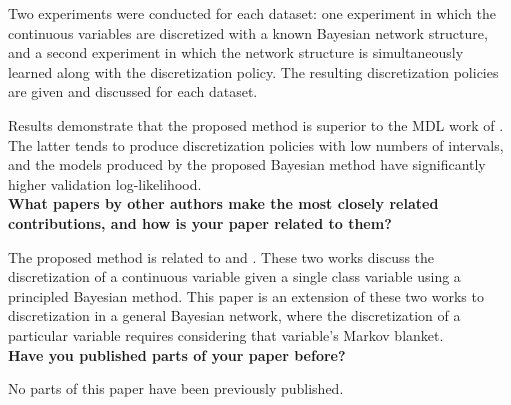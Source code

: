 \documentclass{article}
\begin{document}
Two experiments were conducted for each dataset: one experiment in which the continuous variables are discretized with a known Bayesian network structure, and a second experiment in which the network structure is simultaneously learned along with the discretization policy.
The resulting discretization policies are given and discussed for each dataset.

Results demonstrate that the proposed method is superior to the MDL work of \cite{Friedman_1996}.
The latter tends to produce discretization policies with low numbers of intervals, and the models produced by the proposed Bayesian method have significantly higher validation log-likelihood.\\[0em]

\noindent
\textbf{What papers by other authors make the most closely related contributions, and how is your paper related to them?}

The proposed method is related to \cite{Boulle_2006} and \cite{Lustgarten_2011}.
These two works discuss the discretization of a continuous variable given a single class variable using a principled Bayesian method.
This paper is an extension of these two works to discretization in a general Bayesian network, where the discretization of a particular variable requires considering that variable's Markov blanket.\\[0em]

\noindent
\textbf{Have you published parts of your paper before?}

No parts of this paper have been previously published.



\end{document}
